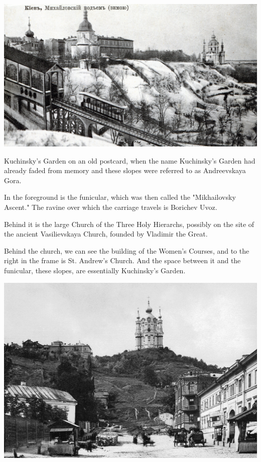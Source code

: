 \documentclass[a5paper,11pt,openany]{article}
\begin{document}
\vspace*{\fill}


\newpage


\vspace*{\fill}

\begin{center}
\includegraphics[width=\linewidth]{kuch01.jpg}
\end{center}

Kuchinsky's Garden on an old postcard, when the name Kuchinsky's Garden had already faded from memory and these slopes were referred to as Andreevskaya Gora.

In the foreground is the funicular, which was then called the "Mikhailovsky Ascent." The ravine over which the carriage travels is Borichev Uvoz.

Behind it is the large Church of the Three Holy Hierarchs, possibly on the site of the ancient Vasilievskaya Church, founded by Vladimir the Great.

Behind the church, we can see the building of the Women's Courses, and to the right in the frame is St. Andrew's Church. And the space between it and the funicular, these slopes, are essentially Kuchinsky's Garden.

\vspace*{\fill}

\newpage

\vspace*{\fill}

\begin{center}
\includegraphics[width=\linewidth]{kuch02.jpg}
\end{center}
\end{document}
